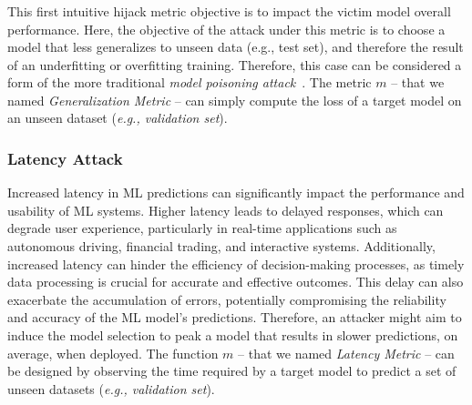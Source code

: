 \subsubsection{}
\label{subsub:generalization}
This first intuitive hijack metric objective is to impact the victim model overall performance. 
Here, the objective of the attack under this metric is to choose a model that less generalizes to unseen data (e.g., test set), and therefore the result of an underfitting or overfitting training.
Therefore, this case can be considered a form of the more traditional \textit{model poisoning attack}~\cite{tian2022comprehensive}.
The metric $m$ -- that we named \textit{Generalization Metric} -- can simply compute the loss of a target model on an unseen dataset (\textit{e.g., validation set}). 
%
\subsubsection{Latency Attack}
\label{subsub:latency}
Increased latency in ML predictions can significantly impact the performance and usability of ML systems.
Higher latency leads to delayed responses, which can degrade user experience, particularly in real-time applications such as autonomous driving, financial trading, and interactive systems. Additionally, increased latency can hinder the efficiency of decision-making processes, as timely data processing is crucial for accurate and effective outcomes. This delay can also exacerbate the accumulation of errors, potentially compromising the reliability and accuracy of the ML model's predictions.
Therefore, an attacker might aim to induce the model selection to peak a model that results in slower predictions, on average, when deployed. 
The function $m$ -- that we named \textit{Latency Metric} -- can be designed by observing the time required by a target model to predict a set of unseen datasets (\textit{e.g., validation set}). 
%
